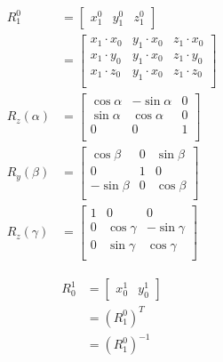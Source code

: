     \begin{align}
      R_{1}^{0}
        &=
        \begin{bmatrix}
          x_{1}^{0} & y_{1}^{0} & z_{1}^{0}
        \end{bmatrix} \\
        &=
        \begin{bmatrix}
          x_{1} \cdot x_{0} & y_{1} \cdot x_{0} & z_{1} \cdot x_{0}  \\
          x_{1} \cdot y_{0} & y_{1} \cdot x_{0} & z_{1} \cdot y_{0}  \\
          x_{1} \cdot z_{0} & y_{1} \cdot x_{0} & z_{1} \cdot z_{0}  \\
        \end{bmatrix} \\
      R_{z}\left( \alpha \right)
        &=
        \begin{bmatrix}
          \cos \alpha & - \sin \alpha & 0 \\
          \sin \alpha & \cos \alpha & 0 \\
          0 & 0 & 1 \\
        \end{bmatrix} \\
      R_{y}\left( \beta \right)
        &=
        \begin{bmatrix}
          \cos \beta & 0 & \sin \beta \\
          0 & 1 & 0 \\
          - \sin \beta & 0 & \cos \beta  \\
        \end{bmatrix} \\
      R_{z}\left( \gamma \right)
        &=
        \begin{bmatrix}
          1 & 0 & 0 \\
          0 & \cos \gamma & - \sin \gamma \\
          0 & \sin \gamma & \cos \gamma  \\
        \end{bmatrix}
    \end{align}

    \begin{align}
      R_{0}^{1}
        &=
        \begin{bmatrix}
          x_{0}^{1} & y_{0}^{1}
        \end{bmatrix} \\
        &= \left( R_{1}^{0} \right)^{T} \\
        &= \left( R_{1}^{0} \right)^{-1}
    \end{align}


